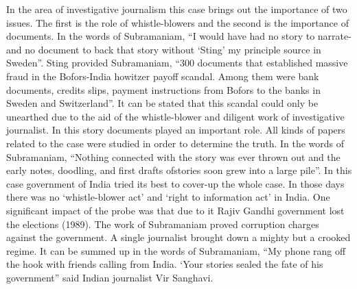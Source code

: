 \begin{multicols}{2}
\noi
In the area of investigative journalism this case brings out the importance of two issues. The
first is the role of whistle-blowers and the second is the importance of documents. In the words
of Subramaniam, “I would have had no story to narrate-and no document to back that story
without ‘Sting’ my principle source in Sweden”. Sting provided Subramaniam, “300 documents
that established massive fraud in the Bofors-India howitzer payoff scandal. Among them were
bank documents, credits slips, payment instructions from Bofors to the banks in Sweden and
Switzerland”. It can be stated that this scandal could only be unearthed due to the aid of the
whistle-blower and diligent work of investigative journalist. In this story documents played an
important role. All kinds of papers related to the case were studied in order to determine the
truth. In the words of Subramaniam, “Nothing connected with the story was ever thrown out
and the early notes, doodling, and first drafts ofstories soon grew into a large pile”. In this case
government of India tried its best to cover-up the whole case. In those days there was no
‘whistle-blower act’ and ‘right to information act’ in India. One significant impact of the probe
was that due to it Rajiv Gandhi government lost the elections (1989). The work of
Subramaniam proved corruption charges against the government. A single journalist brought
down a mighty but a crooked regime. It can be summed up in the words of Subramaniam, “My
phone rang off the hook with friends calling from India. ‘Your stories sealed the fate of his
government” said Indian journalist Vir Sanghavi.

\vspace{-.15cm}


\end{multicols}
